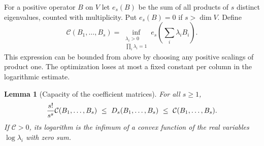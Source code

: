 \documentclass[a4paper,11pt]{article}
\newtheorem{lemma}[proposition]{Lemma}
\theoremstyle{definition}
\theoremstyle{remark}
\numberwithin{equation}{section}
\begin{document}
For a positive operator \(B\) on \(V\) let \(e_s(B)\) be the sum of
all products of \(s\) distinct eigenvalues, counted with multiplicity.
Put \(e_s(B)=0\) if \(s>\dim V\). Define
\[
 \mathcal C(B_1,\ldots,B_s)=
   \inf_{\substack{\lambda_i>0\\\prod_i\lambda_i=1}}
                                  e_s\!\left(\sum_i\lambda_i B_i\right).
\]
This expression can be bounded from above by choosing any positive
scalings of product one. The optimization loses at most a fixed
constant per column in the logarithmic estimate.

\begin{lemma}[Capacity of the coefficient matrices]\leavevmode
\label{lem:capacity489}
For all \(s\ge1\),
\[
 {s!\over s^s}\mathcal C(B_1,\ldots,B_s)
 \ \le\ D_s(B_1,\ldots,B_s)\ \le\ \mathcal C(B_1,\ldots,B_s).
\]
If \(\mathcal C>0\), its logarithm is the infimum of a convex
function of the real variables \(\log\lambda_i\) with zero sum.
\end{lemma}
\end{document}
